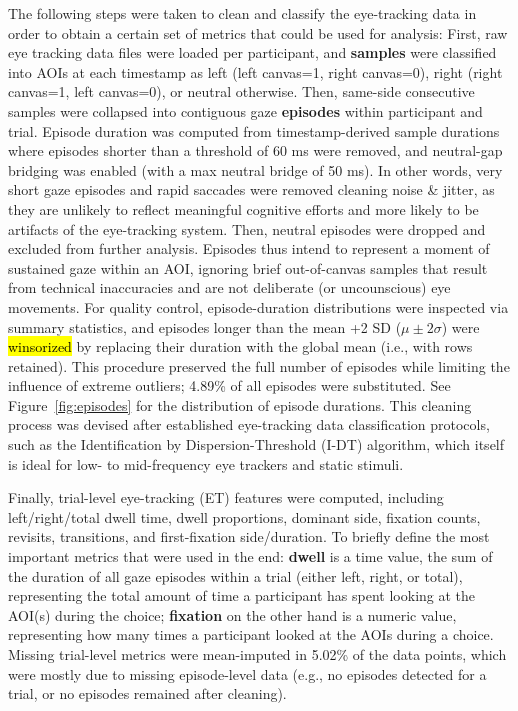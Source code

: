 \documentclass[a4paper, ruler]{CUP-JNL-LIN}%
\begin{document}
The following steps were taken to clean and classify the eye-tracking data in order to obtain a certain set of metrics that could be used for analysis: First, raw eye tracking data files were loaded per participant, and \textbf{samples} were classified into AOIs at each timestamp as left (left canvas=1, right canvas=0), right (right canvas=1, left canvas=0), or neutral otherwise. Then, same-side consecutive samples were collapsed into contiguous gaze \textbf{episodes} within participant and trial. Episode duration was computed from timestamp-derived sample durations where episodes shorter than a threshold of 60 ms were removed, and neutral-gap bridging was enabled (with a max neutral bridge of 50 ms). In other words, very short gaze episodes and rapid saccades were removed cleaning noise \& jitter, as they are unlikely to reflect meaningful cognitive efforts and more likely to be artifacts of the eye-tracking system. Then, neutral episodes were dropped and excluded from further analysis. Episodes thus intend to represent a moment of sustained gaze within an AOI, ignoring brief out-of-canvas samples that result from technical inaccuracies and are not deliberate (or uncounscious) eye movements. For quality control, episode-duration distributions were inspected via summary statistics, and episodes longer than the mean +2 SD ($\mu \pm 2\sigma$) were \hl{winsorized} by replacing their duration with the global mean (i.e., with rows retained). This procedure preserved the full number of episodes while limiting the influence of extreme outliers; 4.89\% of all episodes were substituted. See Figure~\ref{fig:episodes} for the distribution of episode durations. This cleaning process was devised after established eye-tracking data classification protocols, such as the Identification by Dispersion-Threshold (I-DT) algorithm, which itself is ideal for low- to mid-frequency eye trackers and static stimuli.

Finally, trial-level eye-tracking (ET) features were computed, including left/right/total dwell time, dwell proportions, dominant side, fixation counts, revisits, transitions, and first-fixation side/duration. To briefly define the most important metrics that were used in the end: \textbf{dwell} is a time value, the sum of the duration of all gaze episodes within a trial (either left, right, or total), representing the total amount of time a participant has spent looking at the AOI(s) during the choice; \textbf{fixation} on the other hand is a numeric value, representing how many times a participant looked at the AOIs during a choice. Missing trial-level metrics were mean-imputed in 5.02\% of the data points, which were mostly due to missing episode-level data (e.g., no episodes detected for a trial, or no episodes remained after cleaning).
\end{document}
